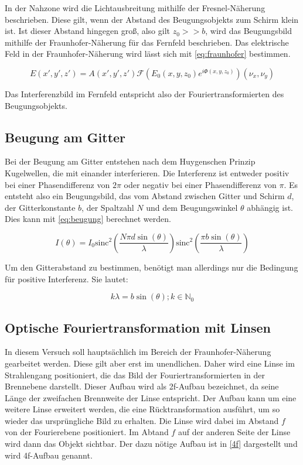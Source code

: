 In der Nahzone wird die Lichtausbreitung mithilfe der Fresnel-Näherung beschrieben. Diese gilt, wenn der Abstand des Beugungsobjekts zum Schirm klein ist. Ist dieser Abstand hingegen groß, also gilt $z_0 >> b$, wird das Beugungsbild mithilfe der Fraunhofer-Näherung für das Fernfeld beschrieben. Das elektrische Feld in der Fraunhofer-Näherung wird lässt sich mit \cref{eq:fraunhofer} bestimmen.

\begin{equation}
E\left( x', y', z'\right) = A\left( x', y', z'\right) \mathcal{F}\left( E_0\left( x, y, z_0\right) e^{i\Phi\left( x, y, z_0\right) }\right) \left( \nu_x, \nu_y\right) 
\label{eq:fraunhofer}
\end{equation}

Das Interferenzbild im Fernfeld entspricht also der Fouriertransformierten des Beugungsobjekts.

\subsection{Beugung am Gitter}
Bei der Beugung am Gitter entstehen nach dem Huygenschen Prinzip Kugelwellen, die mit einander interferieren. Die Interferenz ist entweder positiv bei einer Phasendifferenz von $2\pi$ oder negativ bei einer Phasendifferenz von $\pi$. Es entsteht also ein Beugungsbild, das vom Abstand zwischen Gitter und Schirm $d$, der Gitterkonstante $b$, der Spaltzahl $N$ und dem Beugungswinkel $\theta$ abhängig ist. Dies kann mit \cref{eq:beugung} berechnet werden.

\begin{equation}
I(\theta) = I_0 \text{sinc}^2\left( \frac{N\pi d \sin(\theta)}{\lambda}\right)  \text{sinc}^2\left( \frac{\pi b \sin(\theta)}{\lambda}\right) 
\label{eq:beugung}
\end{equation}

Um den Gitterabstand zu bestimmen, benötigt man allerdings nur die Bedingung für positive Interferenz. Sie lautet:

\begin{equation}
	k \lambda = b \sin(\theta); k\in \mathbb{N}_0
\end{equation}

\subsection{Optische Fouriertransformation mit Linsen}
In diesem Versuch soll hauptsächlich im Bereich der Fraunhofer-Näherung gearbeitet werden. Diese gilt aber erst im unendlichen. Daher wird eine Linse im Strahlengang positioniert, die das Bild der Fouriertransformierten in der Brennebene darstellt. Dieser Aufbau wird als 2f-Aufbau bezeichnet, da seine Länge der zweifachen Brennweite der Linse entspricht. Der Aufbau kann um eine weitere Linse erweitert werden, die eine Rücktransformation ausführt, um so wieder das ursprüngliche Bild zu erhalten. Die Linse wird dabei im Abstand $f$ von der Fourierebene positioniert. Im Abtand $f$ auf der anderen Seite der Linse wird dann das Objekt sichtbar. Der dazu nötige Aufbau ist in \cref{4f} dargestellt und wird 4f-Aufbau genannt.

